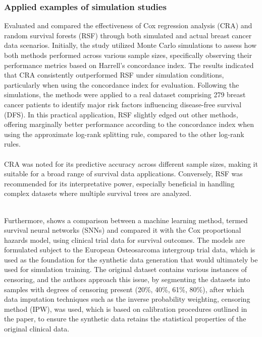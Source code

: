 \subsubsection{Applied examples of simulation studies}

\noindent \parencite{kurt_omurlu_comparisons_2009} Evaluated and compared the effectiveness of Cox regression analysis (CRA) and random survival forests (RSF) through both simulated and actual breast cancer data scenarios. Initially, the study utilized Monte Carlo simulations to assess how both methods performed across various sample sizes, specifically observing their performance metrics based on Harrell's concordance index. The results indicated that CRA consistently outperformed RSF under simulation conditions, particularly when using the concordance index for evaluation. Following the simulations, the methods were applied to a real dataset comprising 279 breast cancer patients to identify major risk factors influencing disease-free survival (DFS). In this practical application, RSF slightly edged out other methods, offering marginally better performance according to the concordance index when using the approximate log-rank splitting rule, compared to the other log-rank rules.
\\\\
\noindent \parencite{kurt_omurlu_comparisons_2009} CRA was noted for its predictive accuracy across different sample sizes, making it suitable for a broad range of survival data applications. Conversely, RSF was recommended for its interpretative power, especially beneficial in handling complex datasets where multiple survival trees are analyzed.
\\\\
\par \noindent Furthermore, \parencite{kantidakis_simulation_2021} shows a comparison between a machine learning method, termed survival neural networks (SNNs) and compared it with the Cox proportional hazards model, using clinical trial data for survival outcomes. The models are formulated subject to the European Osteosarcoma intergroup trial data, which is used as the foundation for the synthetic data generation that would ultimately be used for simulation training. The original dataset contains various instances of censoring, and the authors approach this issue, by segmenting the datasets into samples with degrees of censoring present (20\%, 40\%, 61\%, 80\%), after which data imputation techniques such as the inverse probability weighting, censoring method (IPW), was used, which is based on calibration procedures outlined in the paper, to ensure the synthetic data retains the statistical properties of the original clinical data. 
